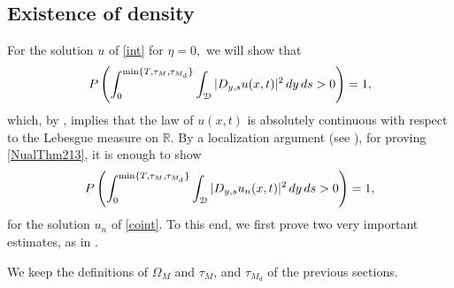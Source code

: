 \documentclass[reqno]{amsart}
\numberwithin{equation}{section}
\newcommand{\cd}{\mathcal{D}}
\begin{document}
\subsection{Existence of density}
For the solution $u$ of \eqref{int} for $\eta=0, $ we will show that
\begin{equation}\label{NualThm213}
P\left(\int_0^{\min\{T,\tau_M,\tau_{M_{\rm d}}\}}\int_{\cd}|D_{y,s}u(x,t)|^2 \,dy\,ds>0\right) =1 ,
\end{equation}
which, by \cite[Theorem 2.1.3]{nual}, implies that the law of $ u(x,t) $ is absolutely continuous with respect to the Lebesgue measure on $\mathbb R. $ By a localization argument (see \cite[Remark 3.1]{JDE18}), for proving  \eqref{NualThm213}, it is enough to show 
$$ P\left(\int_0^{\min\{T,\tau_M,\tau_{M_{\rm d}}\}}\int_{\cd}|D_{y,s}u_n(x,t)|^2 \,dy\,ds>0\right) =1 ,$$for the solution $ u_n$ of \eqref{coint}. To this end, we first prove two very important estimates, as in \cite{web,JDE18}.

We keep the definitions of $\Omega_M$ and $\tau_M$, and $\tau_{M_d}$ of the previous sections.
\end{document}
